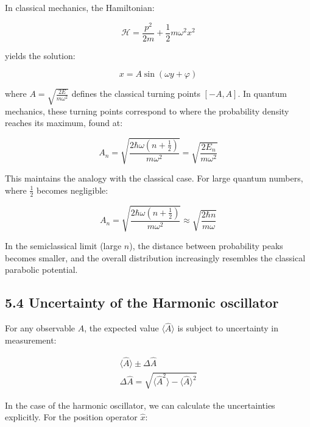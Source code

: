 \documentclass[10pt]{article}
\begin{document}
In classical mechanics, the Hamiltonian:

\begin{equation*}
\mathcal{H} = \frac{p^2}{2m} + \frac{1}{2}m\omega^2 x^2 \tag{5.55}
\end{equation*}

yields the solution:

\begin{equation*}
x = A\sin(\omega y + \varphi) \tag{5.56}
\end{equation*}

where $A = \sqrt{\frac{2E}{m\omega^2}}$ defines the classical turning points $[-A,A]$. In quantum mechanics, these turning points correspond to where the probability density reaches its maximum, found at:

\begin{equation*}
A_n = \sqrt{\frac{2\hbar\omega(n+\frac{1}{2})}{m\omega^2}} = \sqrt{\frac{2E_n}{m\omega^2}} \tag{5.57}
\end{equation*}

This maintains the analogy with the classical case. For large quantum numbers, where $\frac{1}{2}$ becomes negligible:

\begin{equation*}
A_n = \sqrt{\frac{2\hbar\omega(n+\frac{1}{2})}{m\omega^2}} \approx \sqrt{\frac{2\hbar n}{m\omega}} \tag{5.58}
\end{equation*}

In the semiclassical limit (large $n$), the distance between probability peaks becomes smaller, and the overall distribution increasingly resembles the classical parabolic potential.

\subsection*{5.4 Uncertainty of the Harmonic oscillator}

For any observable $\hat{A}$, the expected value $\langle\hat{A}\rangle$ is subject to uncertainty in measurement:

\begin{gather*}
\langle\hat{A}\rangle \pm \Delta\hat{A} \tag{5.59} \\
\Delta\hat{A} = \sqrt{\langle\hat{A}^2\rangle - \langle\hat{A}\rangle^2} \tag{5.60}
\end{gather*}


In the case of the harmonic oscillator, we can calculate the uncertainties explicitly. For the position operator $\hat{x}$:
\end{document}
